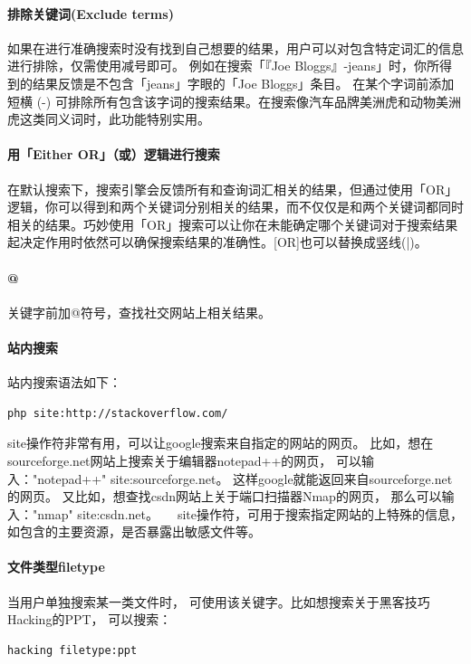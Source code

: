 \documentclass{book}
\begin{document}
\paragraph{排除关键词(Exclude terms)}
如果在进行准确搜索时没有找到自己想要的结果，用户可以对包含特定词汇的信息进行排除，仅需使用减号即可。
例如在搜索「『Joe Bloggs』-jeans」时，你所得到的结果反馈是不包含「jeans」字眼的「Joe Bloggs」条目。
在某个字词前添加短横 (-) 可排除所有包含该字词的搜索结果。在搜索像汽车品牌美洲虎和动物美洲虎这类同义词时，此功能特别实用。

\paragraph{用「Either OR」（或）逻辑进行搜索}
在默认搜索下，搜索引擎会反馈所有和查询词汇相关的结果，但通过使用「OR」逻辑，你可以得到和两个关键词分别相关的结果，而不仅仅是和两个关键词都同时相关的结果。巧妙使用「OR」搜索可以让你在未能确定哪个关键词对于搜索结果起决定作用时依然可以确保搜索结果的准确性。[OR]也可以替换成竖线(|)。

\paragraph{@}关键字前加@符号，查找社交网站上相关结果。

\paragraph{站内搜索}站内搜索语法如下：

\begin{lstlisting}
php site:http://stackoverflow.com/
\end{lstlisting}

site操作符非常有用，可以让google搜索来自指定的网站的网页。
比如，想在sourceforge.net网站上搜索关于编辑器notepad++的网页，
可以输入："notepad++"  site:sourceforge.net。
这样google就能返回来自sourceforge.net的网页。
又比如，想查找csdn网站上关于端口扫描器Nmap的网页，
那么可以输入："nmap"  site:csdn.net。　　site操作符，可用于搜索指定网站的上特殊的信息，
如包含的主要资源，是否暴露出敏感文件等。

\paragraph{文件类型filetype}当用户单独搜索某一类文件时，
可使用该关键字。比如想搜索关于黑客技巧Hacking的PPT，
可以搜索：

\begin{lstlisting}
hacking filetype:ppt
\end{lstlisting}
\end{document}
